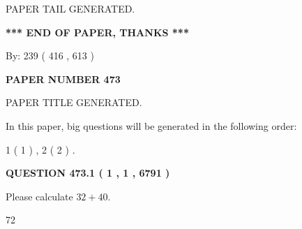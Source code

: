 \documentclass[12pt]{article}
\begin{document}
   
   
\vspace{2.0in} PAPER TAIL GENERATED.
   
   
   
   
\vspace{1.0in} 
{\textbf{\large{ *** END OF PAPER, THANKS *** }}} 
   
   
\hspace{1.0in} By: 
 239 ( 416 ,  613 )
   
   
   
   
\newpage 
\setcounter{page}{ 
   473001 } 
   
   
   
   
 {\textbf{ \Large{ PAPER NUMBER  473  }}}
   
   
\vspace{0.2in}
   
   
   
   
   
   
   
   
 \vspace{0.2in}
 
 
 
 
   
   
 PAPER TITLE GENERATED.
   
   
   
\vspace{0.2in}
   
In this paper, big questions will be generated in the following order: 
   
   
   1 ( 1 )
 ,
   2 ( 2 )
 .
  
\vspace{0.2in}
  
{\textbf{\Large{QUESTION
473.1 
 ( 1 , 1 , 6791 )
}}}
  
  
 
Please calculate $ %
32 +  %
40 $.
 
 
 
\noindent{}
 
 

72
 
 
\noindent{}
 
 

 
 
 
\noindent{}
 
\end{document}
